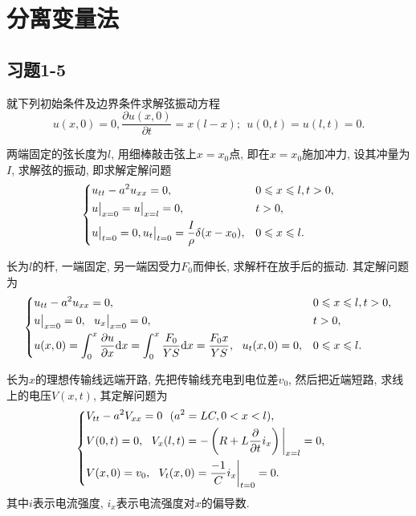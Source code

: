 

\chapter{分离变量法}

\section{习题1-5}

\begin{yyEx}
	就下列初始条件及边界条件求解弦振动方程
	\begin{equation*}
		u(x,0) = 0,\frac{\partial u(x,0)}{\partial t} = x(l-x);~~u(0,t) = u(l,t) = 0.
	\end{equation*}
\end{yyEx}

\begin{yyEx}
	两端固定的弦长度为$l$, 用细棒敲击弦上$x = x_0$点, 即在$x = x_0$施加冲力, 设其冲量为$I$, 求解弦的振动, 即求解定解问题
	\begin{equation*}
		\begin{dcases}
			u_{tt} - a^2u_{xx} = 0, &0\leqslant x\leqslant l,t>0,\\
			u\big|_{x = 0} = u\big|_{x = l} = 0, &t>0,\\
			u\big|_{t = 0} = 0,u_t\big|_{t = 0} = \frac{I}{\rho}\delta(x - x_0), &0\leqslant x\leqslant l.
		\end{dcases}
	\end{equation*}
\end{yyEx}

\begin{yyEx}
	长为$l$的杆, 一端固定, 另一端因受力$F_0$而伸长, 求解杆在放手后的振动. 其定解问题为
	\begin{equation*}
	\begin{dcases}
	u_{tt} - a^2u_{xx} = 0, &0\leqslant x\leqslant l,t>0,\\
	u\big|_{x = 0} = 0,~~ u_x\big|_{x = 0} = 0, &t>0,\\
	u(x,0) = \int_{0}^{x}\frac{\partial u}{\partial x}\mathrm{d}x = \int_{0}^{x}\frac{F_0}{YS}\mathrm{d}x = \frac{F_0x}{YS},~~u_t(x,0) = 0, &0\leqslant x\leqslant l.
	\end{dcases}
	\end{equation*}
\end{yyEx}

\begin{yyEx}
	长为$x$的理想传输线远端开路, 先把传输线充电到电位差$v_0$, 然后把近端短路, 求线上的电压$V(x,t)$, 其定解问题为
	\begin{equation*}
	\begin{dcases}
	V_{tt} - a^2V_{xx} = 0~~(a^2 = LC,0<x<l),&~\\
	V(0,t) = 0,~~V_x(l,t) = -\left(R+L\frac{\partial}{\partial t}i_x \right)\bigg|_{x = l} = 0,&~\\
	V(x,0) = v_0,~~V_t(x,0) = \frac{-1}{C}i_x\bigg|_{t = 0} = 0.
	\end{dcases}
	\end{equation*}
	其中$i$表示电流强度, $i_x$表示电流强度对$x$的偏导数.
\end{yyEx}

